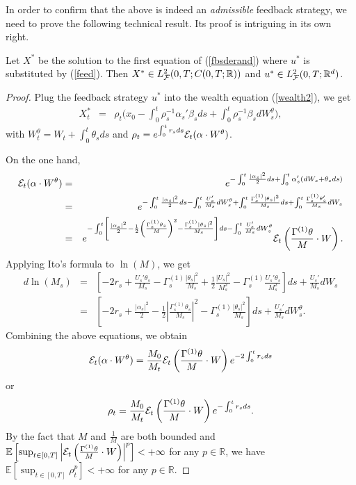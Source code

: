 \documentclass[final]{siamltex}
\begin{document}
In order to confirm that the above is indeed an {\it admissible} feedback strategy, we need to prove the following technical
result. Its proof is intriguing in its own right.
\begin{proposition}
Let $X^*$ be the solution to the first equation of (\ref{fbsderand}) where $u^*$ is substituted by (\ref{feed}). Then
$X^*\in L^2_{\cal F}(0,T;C(0,T;{\mathbb{R}}))$ and $u^*\in L^2_{\cal F}(0,T;{\mathbb{R}}^d)$.
\end{proposition}

\begin{proof}
Plug the feedback strategy $u^*$ into the wealth equation (\ref{wealth2}), we get
\begin{eqnarray}\label{formulaX}
 X_t^*&=&\rho_t\Big(x_0-\int_0^t \rho_s^{-1}\alpha_s'\beta_sds+\int_0^t \rho_s^{-1}\beta_sdW_s^\theta\Big),
\end{eqnarray}
with $W^\theta_t=W_t+\int_0^t\theta_sds$ and $\rho_t=e^{\int_0^tr_sds} {\cal E}_t(\alpha\cdot W^\theta)$.

On the one hand,
\begin{eqnarray*}
{\cal E}_t(\alpha\cdot W^\theta)&=&e^{-\int_0^t \frac{|\alpha_s|^2}{2}ds+\int_0^t\alpha_s'(dW_s+\theta_sds)}\\
&=&e^{-\int_0^t \frac{|\alpha_s|^2}{2}ds-\int_0^t\frac{U_s'}{M_s}dW^\theta_s+\int_0^t\frac{\Gamma^{(1)}_s|\theta_s|^2}{M_s}ds +\int_0^t\frac{\Gamma^{(1)}_s\theta_s'}{M_s}dW_s}\\
&=&e^{-\int_0^t
\left[\frac{|\alpha_s|^2}{2}-\frac{1}{2}\left(\frac{\Gamma^{(1)}_s\theta_s}{M}\right)^2-\frac{\Gamma^{(1)}_s|\theta_s|^2}{M_s}
\right]ds-\int_0^t\frac{U_s'}{M_s}dW^\theta_s}{\cal
E}_t\left(\frac{\Gamma^{(1)}\theta}{M}\cdot W\right).
\end{eqnarray*}
Applying Ito's formula to $\ln(M)$, we get
\begin{eqnarray*}
d\ln(M_s)&=& [-2r_s+\frac{U_s'\theta_s}{M_s}-\Gamma^{(1)}_s
\frac{|\theta_s|^2}{M_s}
+\frac{1}{2}\frac{|U_s|^2}{M_s^2}-\Gamma^{(1)}_s\frac{U_s'\theta_s}{M_s^2}]ds+\frac{U_s'}{M_s}dW_s\\
&=&\left[-2r_s+\frac{|\alpha_s|^2}{2}-\frac{1}{2}\left|\frac{\Gamma^{(1)}_s\theta_s}{M_s}\right|^2-\Gamma^{(1)}_s\frac{|\theta_s|^2}{M_s}\right]ds+\frac{U_s'}{M_s}dW_s^\theta.
\end{eqnarray*}
Combining the above equations, we obtain
$${\cal E}_t(\alpha\cdot W^\theta)=\frac{M_0}{M_t}{\cal E}_t\left(\frac{\Gamma^{(1)}\theta}{M}\cdot W\right)e^{-2\int_0^t r_sds}$$
or
$$\rho_t=\frac{M_0}{M_t}{\cal E}_t\left(\frac{\Gamma^{(1)}\theta}{M}\cdot W\right)e^{-\int_0^t r_sds}.$$
By the fact that $M$ and $\frac{1}{M}$ are both bounded and
${\mathbb{E}\left[{\sup_{t\in [0,T]} \left|{\cal
E}_t\left(\frac{\Gamma^{(1)}\theta}{M}\cdot
W\right)\right|^p}\right]}<+\infty$ for any $p\in {\mathbb{R}}$, we have
${\mathbb{E}\left[{\sup_{t\in [0,T]}\rho_t^p}\right]}<+\infty$ for any $p\in {\mathbb{R}}$.


\end{proof}
\end{document}
